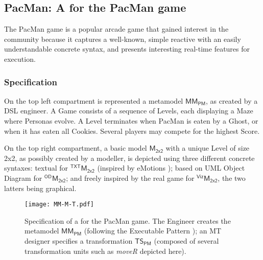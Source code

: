 \subsection{\textsf{PacMan}: A \DSL for the PacMan game}
\label{sec:Examples:PacMan}

The PacMan game is a popular arcade game that gained interest in the \MDE community
because it captures a well-known, simple reactive \DSL with an easily understandable
concrete syntax, and presents interesting real-time features for execution. 

\subsubsection{Specification}
\label{sec:Examples:PacMan:Specification}

On the top left compartment is represented a metamodel
$\mathsf{MM}_{\mathsf{PM}}$, as created by a DSL engineer. A \textsf{Game} 
consists of a sequence of \textsf{Level}s, each displaying a \textsf{Maze} where
\textsf{Persona}s evolve. A \textsf{Level} terminates when \textsf{PacMan} is eaten
by a \textsf{Ghost}, or when it has eaten all \textsf{Cookie}s. Several players
may compete for the highest \textsf{Score}.

On the top right compartment, a basic model $\mathsf{M}_{\mathsf{2x2}}$ with a
\textsf{unique} \textsf{Level} of size 2x2, as possibly created by a modeller,
is depicted using three different concrete syntaxes:
textual for $^{\mathsf{TXT}}\mathsf{M}_{\mathsf{2x2}}$ (inspired by eMotions 
\cite{J:RiveraDuranVallecillo:2009}); based on UML Object Diagram 
\cite{B:Rumbaugh-Jacobson-Booch:2004} for $^{\mathsf{OD}}\mathsf{M}_{\mathsf{2x2}}$;
and freely inspired by the real game for $^{\mathsf{Viz}}\mathsf{M}_{\mathsf{2x2}}$,
the two latters being graphical.

\begin{figure*}[t]
   \texttt{[image: MM-M-T.pdf]}
   \caption{Specification of a \DSL for the PacMan game.%
   The \DSL Engineer creates the metamodel $\mathsf{MM}_{\mathsf{PM}}$ (following
   the Executable \DSML Pattern \citep{Combemale-Cregut-Pantel:2012}); an MT 
   designer specifies a transformation $\mathsf{TS}_{\mathsf{PM}}$ (composed of
   several transformation units such as \emph{\textsf{moveR}} depicted here).}
   \label{fig:PacMan}
\end{figure*}

